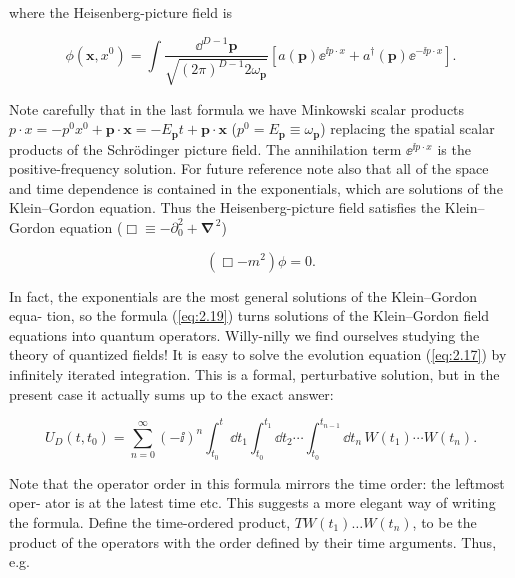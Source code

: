 where the Heisenberg-picture field is

\begin{equation}
\phi(\mathbf x,x^0)=\int\frac{\dd^{D-1}\mathbf p}{\sqrt{(2\pi)^{D-1} 2\omega_{\mathbf p}}}\left[a(\mathbf p)\ee^{\ii p\mathbin{\cdot}x}+a^\dagger(\mathbf p)\ee^{-\ii p\mathbin{\cdot}x}\right].
\label{eq:2.14}
\end{equation}

Note carefully that in the last formula we have Minkowski scalar products $p\mathbin{\cdot}x=
-p^0x^0+\mathbf p\mathbin{\cdot}\mathbf x=-E_{\mathbf p}t+\mathbf p\mathbin{\cdot}\mathbf x$ ($p^0=E_{\mathbf p}\equiv\omega_{\mathbf p}$) replacing the spatial scalar products of the Schrödinger
picture field. The annihilation term $\ee^{\ii p\mathbin{\cdot}x}$ is the positive-frequency solution. For future reference note also that all of the space and time dependence
is contained in the exponentials, which are solutions of the Klein--Gordon equation.
Thus the Heisenberg-picture field satisfies the Klein--Gordon equation ($\Box\equiv-\partial_0^2+\boldsymbol{\nabla}^{\,2}$)

\begin{equation}
(\Box-m^2)\phi=0.
\label{eq:2.15}
\end{equation}

In fact, the exponentials are the most general solutions of the Klein--Gordon equa-
tion, so the formula (\ref{eq:2.19}) turns solutions of the Klein--Gordon field equations into
quantum operators. Willy-nilly we find ourselves studying the theory of quantized
fields!
It is easy to solve the evolution equation (\ref{eq:2.17}) by infinitely iterated integration. This
is a formal, perturbative solution, but in the present case it actually sums up to the
exact answer:

\begin{equation}
U_D(t,t_0)=\sum_{n=0}^{\infty}(-\ii)^n\int_{t_0}^{t}\dd t_1\int_{t_0}^{t_1}\dd t_2\cdots\int_{t_0}^{t_{n-1}}\dd t_n\,W(t_1)\cdots W(t_n).
\label{eq:2.16}
\end{equation}

Note that the operator order in this formula mirrors the time order: the leftmost oper-
ator is at the latest time etc. This suggests a more elegant way of writing the formula.
Define the time-ordered product, $TW(t_1)\ldots W(t_n)$, to be the product of the operators
with the order defined by their time arguments. Thus, e.g.

